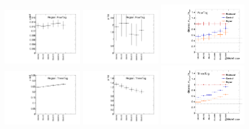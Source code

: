 \begin{figure}[htbp!]
\begin{center}
\includegraphics[angle=270, width=0.3\textwidth]{./figures/boosted/Appendix_SB/FourTag_muqcdSBshift.pdf}
\includegraphics[angle=270, width=0.3\textwidth]{./figures/boosted/Appendix_SB/FourTag_mutopSBshift.pdf}
\includegraphics[angle=270, width=0.33\textwidth]{./figures/boosted/Appendix_SB/data_est_FourTag_sigma_compareSBshift.pdf}\\
\includegraphics[angle=270, width=0.3\textwidth]{./figures/boosted/Appendix_SB/ThreeTag_muqcdSBshift.pdf}
\includegraphics[angle=270, width=0.3\textwidth]{./figures/boosted/Appendix_SB/ThreeTag_mutopSBshift.pdf}
\includegraphics[angle=270, width=0.33\textwidth]{./figures/boosted/Appendix_SB/data_est_ThreeTag_sigma_compareSBshift.pdf}\\

\end{center}
\end{figure}
